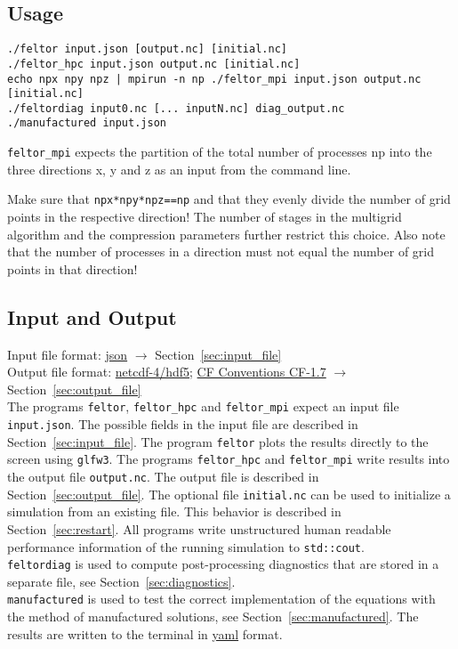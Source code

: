 \subsection{Usage}
\begin{verbatim}
./feltor input.json [output.nc] [initial.nc]
./feltor_hpc input.json output.nc [initial.nc]
echo npx npy npz | mpirun -n np ./feltor_mpi input.json output.nc [initial.nc]
./feltordiag input0.nc [... inputN.nc] diag_output.nc
./manufactured input.json
\end{verbatim}

\begin{tcolorbox}[title=Note]
    \texttt{feltor_mpi} expects the
partition of the total number of processes np into the three directions x, y and z
as an input from the command line.
\end{tcolorbox}
Make sure that \texttt{npx*npy*npz==np} and that
they evenly divide the number of grid points in the respective direction! The
number of stages in the multigrid algorithm and the compression parameters further
restrict this choice. Also note that the number of processes in a direction must
not equal the number of grid points in that direction!

\subsection{Input and Output}
Input file format: \href{https://en.wikipedia.org/wiki/JSON}{json} $\rightarrow$ Section~\ref{sec:input_file} \\
Output file format: \href{https://www.unidata.ucar.edu/software/netcdf/docs/}{netcdf-4/hdf5};
\href{http://cfconventions.org/Data/cf-conventions/cf-conventions-1.7/cf-conventions.html}{CF Conventions CF-1.7}
 $\rightarrow$ Section~\ref{sec:output_file} \\

 The programs \texttt{feltor}, \texttt{feltor_hpc} and \texttt{feltor_mpi}
 expect an input file \texttt{input.json}.
 The possible fields in the input file are described in Section~\ref{sec:input_file}.
 The program \texttt{feltor} plots the results directly to the screen using \texttt{glfw3}.
 The programs \texttt{feltor_hpc} and \texttt{feltor_mpi} write results into
 the output file \texttt{output.nc}.
 The output file is described in Section~\ref{sec:output_file}.
 The optional file \texttt{initial.nc} can be used to initialize a simulation from an existing file.
 This behavior is described in Section~\ref{sec:restart}.
 All programs write unstructured human readable performance information of the running simulation
 to \texttt{std::cout}.
 \\
 \texttt{feltordiag} is used to compute post-processing diagnostics that are
 stored in a separate file, see Section~\ref{sec:diagnostics}.
 \\
 \texttt{manufactured} is used to test the correct implementation of
 the equations with the method of manufactured solutions, see
 Section~\ref{sec:manufactured}.  The results are written to the terminal in
 \href{https://en.wikipedia.org/wiki/YAML}{yaml} format.

